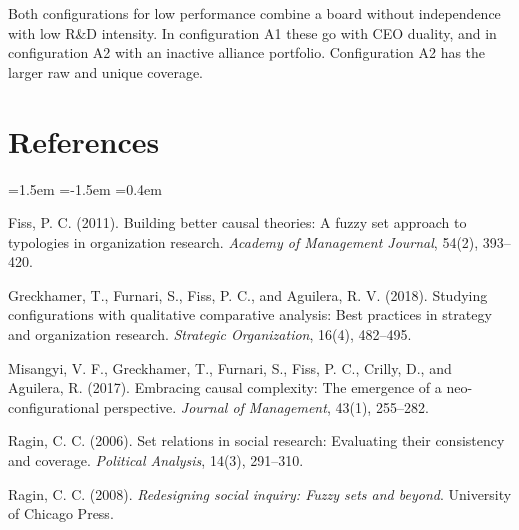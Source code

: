 \documentclass[11pt]{article}
\begin{document}
Both configurations for low performance combine a board without independence with low R\&D intensity. In configuration A1 these go with CEO duality, and in configuration A2 with an inactive alliance portfolio. Configuration A2 has the larger raw and unique coverage.

\clearpage
\section*{References}

\begin{list}{}{\leftmargin=1.5em \itemindent=-1.5em \itemsep=0.4em}
\item Fiss, P. C. (2011). Building better causal theories: A fuzzy set approach to typologies in organization research. \emph{Academy of Management Journal}, 54(2), 393--420.
\item Greckhamer, T., Furnari, S., Fiss, P. C., and Aguilera, R. V. (2018). Studying configurations with qualitative comparative analysis: Best practices in strategy and organization research. \emph{Strategic Organization}, 16(4), 482--495.
\item Misangyi, V. F., Greckhamer, T., Furnari, S., Fiss, P. C., Crilly, D., and Aguilera, R. (2017). Embracing causal complexity: The emergence of a neo-configurational perspective. \emph{Journal of Management}, 43(1), 255--282.
\item Ragin, C. C. (2006). Set relations in social research: Evaluating their consistency and coverage. \emph{Political Analysis}, 14(3), 291--310.
\item Ragin, C. C. (2008). \emph{Redesigning social inquiry: Fuzzy sets and beyond}. University of Chicago Press.
\end{list}
\end{document}
